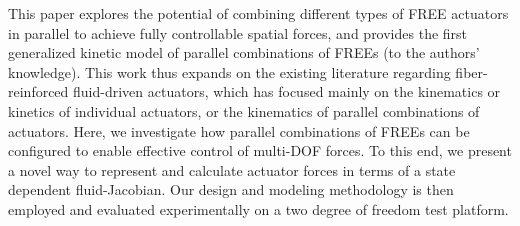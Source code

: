 This paper explores the potential of combining different types of FREE actuators in parallel to achieve fully controllable spatial forces, and provides the first generalized kinetic model of parallel combinations of FREEs (to the authors' knowledge).
This work thus expands on the existing literature regarding fiber-reinforced fluid-driven actuators, which has focused mainly on the kinematics or kinetics of individual actuators, or the kinematics of parallel combinations of actuators.
Here, we investigate how parallel combinations of FREEs can be configured to enable effective control of multi-DOF forces.
To this end, we present a novel way to represent and calculate actuator forces in terms of a state dependent fluid-Jacobian.
Our design and modeling methodology is then employed and evaluated experimentally on a two degree of freedom test platform.














